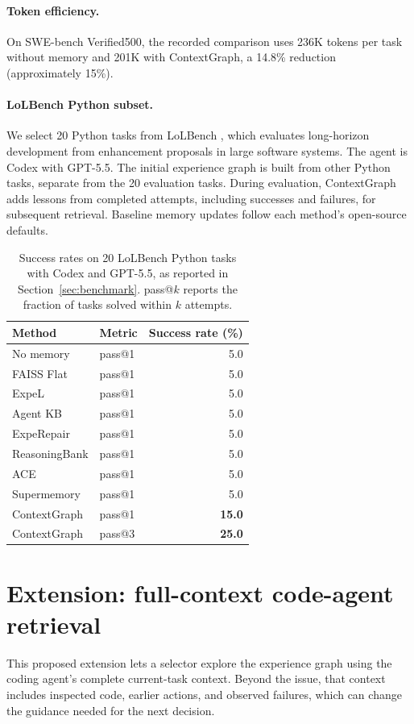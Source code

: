 \paragraph{Token efficiency.}
On SWE-bench Verified500, the recorded comparison uses 236K tokens per task
without memory and 201K with ContextGraph, a 14.8\% reduction
(approximately 15\%).

\paragraph{LoLBench Python subset.}
We select 20 Python tasks from LoLBench \citep{lolbench2026}, which evaluates
long-horizon development from enhancement proposals in large software
systems. The agent is Codex with GPT-5.5. The initial experience graph is
built from other Python tasks, separate from the 20 evaluation tasks.
During evaluation, ContextGraph adds lessons from completed attempts,
including successes and failures, for subsequent retrieval. Baseline
memory updates follow each method's open-source defaults.

\begin{table}[htbp]
\centering
\caption{Success rates on 20 LoLBench Python tasks with Codex and GPT-5.5,
as reported in Section~\ref{sec:benchmark}.
pass@$k$ reports the fraction of tasks solved within $k$ attempts.}
\label{tab:new-codex55}
\begin{tabular}{llr}
\toprule
Method & Metric & Success rate (\%) \\
\midrule
No memory & pass@1 & 5.0 \\
FAISS Flat & pass@1 & 5.0 \\
ExpeL & pass@1 & 5.0 \\
Agent KB & pass@1 & 5.0 \\
ExpeRepair & pass@1 & 5.0 \\
ReasoningBank & pass@1 & 5.0 \\
ACE & pass@1 & 5.0 \\
Supermemory & pass@1 & 5.0 \\
ContextGraph & pass@1 & \textbf{15.0} \\
\midrule
ContextGraph & pass@3 & \textbf{25.0} \\
\bottomrule
\end{tabular}
\end{table}

\clearpage
\section{Extension: full-context code-agent retrieval}
\label{sec:agentic-retrieval}
This proposed extension lets a selector explore the experience graph using
the coding agent's complete current-task context. Beyond the issue, that
context includes inspected code, earlier actions, and observed failures,
which can change the guidance needed for the next decision.


